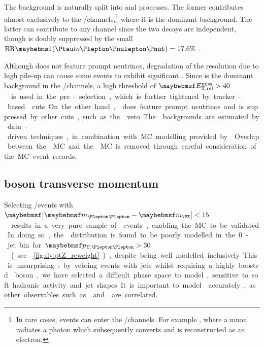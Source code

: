 
The \DY background is naturally split into \DYll and \DYtt processes. The former 
contributes almost exclusively to the \eech/\mmch channels,\footnote{
	In rare cases, \DYll events can enter the \emch/\mech channels. For example 
	\HepProcess{\DY \HepTo \Pmu\Pmu\Pphoton}, where a muon radiates a photon which 
	subsequently converts and is reconstructed as an electron.
}
where it is the dominant background. The latter can contribute to any channel since the 
two \HepProcess{\Ptau \HepTo \Plepton\Pnulepton\Pnut} decays are independent, though is 
doubly suppressed by the small $\text{BR}\parenths{\HepProcess{\Ptau \HepTo 
\Plepton\Pnulepton\Pnut}} = 17.6\%$ \cite{PDG:2012}.

Although \DYll does not feature prompt neutrinos, degradation of the \met resolution due 
to high pile-up can cause some \DYll events to exhibit significant \met. Since \DYll is the 
dominant background in the \eech/\mmch channels, a high threshold of 
\unit{$\calometrel > 40$}{\GeV} is used in the pre-selection, which is further tightened by 
tracker-based \trackmetrel cuts. On the other hand, \DYtt does feature prompt neutrinos and 
is suppressed by other cuts, such as the \mtautau veto.

The \DY backgrounds are estimated by data-driven techniques, in combination with MC 
modelling provided by \meps{\alpgen}{\fherwig}. Overlap between the \DY MC and the 
\Zgamma MC is removed through careful consideration of the MC event records.



\subsection{\DY boson transverse momentum}
\label{sec:dy:pt}

Selecting \eech/\mmch events with \unit{$\mods{\mll - \mZ} < 15$}{\GeV} results in a very 
pure sample of \DYll events, enabling the MC to be validated. In doing so, the \ptll 
distribution is found to be poorly modelled in the 0-jet bin for \unit{$\ptll > 30$}{\GeV} 
(see \Figure~\ref{fig:dy:ptZ_reweight}), despite being well modelled inclusively. 
This is unsurprising: by vetoing events with jets whilst requiring a highly boosted \DY 
boson, we have selected a difficult phase space to model, sensitive to soft hadronic 
activity and jet shapes. It is important to model \ptll accurately, as other observables 
such as \dphill and \ptleadlep are correlated.

